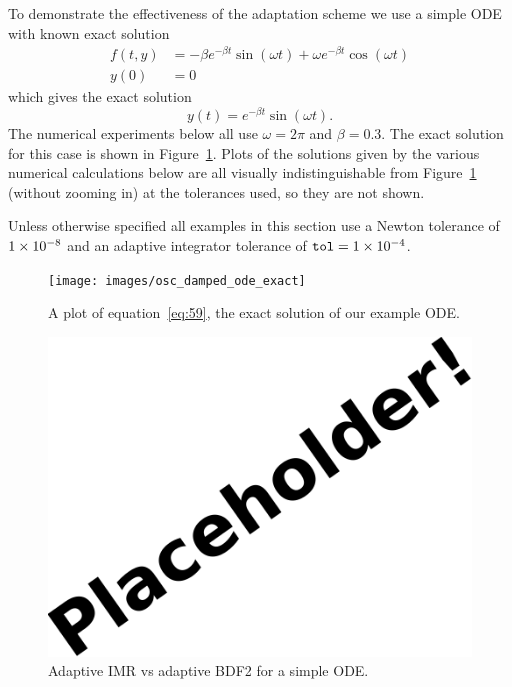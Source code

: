 To demonstrate the effectiveness of the adaptation scheme we use a simple ODE with known exact solution
\begin{align}
  f(t,y) &= - \beta e^{-\beta t} \sin(\omega t) + \omega e^{-\beta t} \cos(\omega t) \\
  y(0) &= 0
\end{align}
which gives the exact solution
\begin{equation}
  \label{eq:59}
  y(t) = e^{-\beta t} \sin(\omega t).
\end{equation}
The numerical experiments below all use $\omega = 2 \pi$ and $\beta = 0.3$.
The exact solution for this case is shown in Figure~\ref{fig:mp-ode-exact}.
Plots of the solutions given by the various numerical calculations below are all visually indistinguishable from Figure~\ref{fig:mp-ode-exact} (without zooming in) at the tolerances used, so they are not shown.

Unless otherwise specified all examples in this section use a Newton tolerance of $1\times 10^{-8}$ and an adaptive integrator tolerance of ${\textrm{\textup{\texttt{tol}}}} = 1\times 10^{-4}$.

\begin{figure}[ht!]
  \centering
  \texttt{[image: images/osc\_damped\_ode\_exact]}
  \caption{A plot of equation~\eqref{eq:59}, the exact solution of our example ODE.}
  \label{fig:mp-ode-exact}
\end{figure}

\begin{figure}[ht!]
  \centering
  \includegraphics{images/placeholder}
  \caption{Adaptive IMR vs adaptive BDF2 for a simple ODE.}
  \label{fig:mp-vs-bdf2}
\end{figure}

